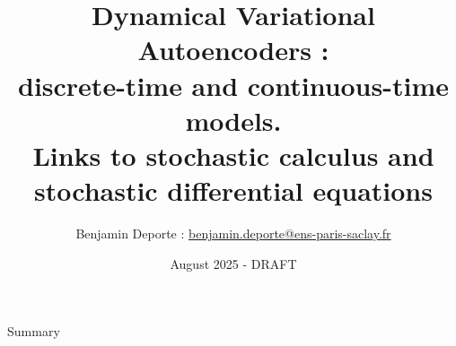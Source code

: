 \documentclass[8pt, aspectratio=169]{beamer}
\title{Dynamical Variational Autoencoders :\\ discrete-time and continuous-time models.\\ Links to stochastic calculus and stochastic differential equations}
\author{
Benjamin Deporte : \href{mailto:benjamin.deporte@ens-paris-saclay.fr}{benjamin.deporte@ens-paris-saclay.fr}%
}
\date{August 2025 - DRAFT}
\begin{document}
\maketitle

\begin{frame}{Summary}
    \tableofcontents
\end{frame}







% 

\end{document}
